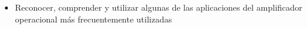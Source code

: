
\begin{itemize}
    \item Reconocer, comprender y utilizar algunas de las aplicaciones del amplificador operacional más frecuentemente utilizadas
\end{itemize}